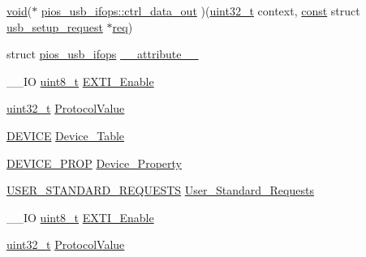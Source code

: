 \begin{DoxyCompactItemize}
\item 
\hyperlink{group___n_a_m_e_ga18028b8badbf1ea7e704ccac3c488e82}{void}($\ast$ \hyperlink{group___p_i_o_s___u_s_b_h_o_o_k_ga7fce932d233ec743f190170b5b277746}{pios\-\_\-usb\-\_\-ifops\-::ctrl\-\_\-data\-\_\-out} )(\hyperlink{stdint_8h_a435d1572bf3f880d55459d9805097f62}{uint32\-\_\-t} context, \hyperlink{group___n_a_m_e_ga7ae6d0e43244213b34de2c2b9aa30da6}{const} struct \hyperlink{structusb__setup__request}{usb\-\_\-setup\-\_\-request} $\ast$\hyperlink{pios__opahrs__proto_8h_ad651fd9affe5ed0ac9abccd8e2791a2c}{req})
\item 
struct \hyperlink{structpios__usb__ifops}{pios\-\_\-usb\-\_\-ifops} \hyperlink{group___p_i_o_s___u_s_b_h_o_o_k_gaefc540229d1ad4829fb317812135c7b4}{\-\_\-\-\_\-attribute\-\_\-\-\_\-}
\item 
\-\_\-\-\_\-\-I\-O \hyperlink{stdint_8h_aba7bc1797add20fe3efdf37ced1182c5}{uint8\-\_\-t} \hyperlink{group___p_i_o_s___u_s_b_h_o_o_k_ga80e4a20c4f7576283232cda440c47694}{E\-X\-T\-I\-\_\-\-Enable}
\item 
\hyperlink{stdint_8h_a435d1572bf3f880d55459d9805097f62}{uint32\-\_\-t} \hyperlink{group___p_i_o_s___u_s_b_h_o_o_k_ga271c451896dad2b849277faad3eb3ea6}{Protocol\-Value}
\item 
\hyperlink{_s_t_m32_f10x_2_libraries_2_s_t_m32___u_s_b-_f_s-_device___driver_2inc_2usb__core_8h_a85594805bde95346bc3a19853317a89d}{D\-E\-V\-I\-C\-E} \hyperlink{group___p_i_o_s___u_s_b_h_o_o_k_gafa47e7c7d5d6fb4c682e16c89c1b7d75}{Device\-\_\-\-Table}
\item 
\hyperlink{_s_t_m32_f10x_2_libraries_2_s_t_m32___u_s_b-_f_s-_device___driver_2inc_2usb__core_8h_a90353becd4185446508b796a7f39fbce}{D\-E\-V\-I\-C\-E\-\_\-\-P\-R\-O\-P} \hyperlink{group___p_i_o_s___u_s_b_h_o_o_k_ga646bdfc60e69ee637f2c39b5bb91dfec}{Device\-\_\-\-Property}
\item 
\hyperlink{_s_t_m32_f10x_2_libraries_2_s_t_m32___u_s_b-_f_s-_device___driver_2inc_2usb__core_8h_abf9887b82ae511cfb155d0d97c9a7c1a}{U\-S\-E\-R\-\_\-\-S\-T\-A\-N\-D\-A\-R\-D\-\_\-\-R\-E\-Q\-U\-E\-S\-T\-S} \hyperlink{group___p_i_o_s___u_s_b_h_o_o_k_ga8d70d0a7e05cf9c172e4304def6b65b8}{User\-\_\-\-Standard\-\_\-\-Requests}
\item 
\-\_\-\-\_\-\-I\-O \hyperlink{stdint_8h_aba7bc1797add20fe3efdf37ced1182c5}{uint8\-\_\-t} \hyperlink{group___p_i_o_s___u_s_b_h_o_o_k_ga80e4a20c4f7576283232cda440c47694}{E\-X\-T\-I\-\_\-\-Enable}
\item 
\hyperlink{stdint_8h_a435d1572bf3f880d55459d9805097f62}{uint32\-\_\-t} \hyperlink{group___p_i_o_s___u_s_b_h_o_o_k_ga271c451896dad2b849277faad3eb3ea6}{Protocol\-Value}

\end{DoxyCompactItemize}
